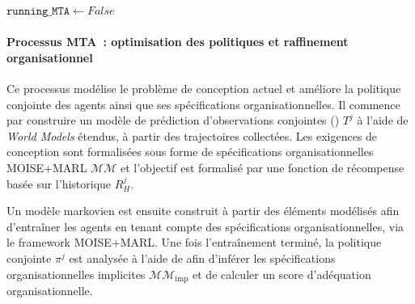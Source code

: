 \begin{algorithm}[h!]
{  

  $\texttt{running\_MTA} \gets False$ 

  }
\end{algorithm}

\paragraph{Processus MTA~: optimisation des politiques et raffinement organisationnel}

Ce processus modélise le problème de conception actuel et améliore la politique conjointe des agents ainsi que ses spécifications organisationnelles. Il commence par construire un modèle de prédiction d'observations conjointes () $T^j$ à l'aide de \textit{World Models} étendus, à partir des trajectoires collectées. Les exigences de conception sont formalisées sous forme de spécifications organisationnelles MOISE+MARL $\mathcal{MM}$ et l'objectif est formalisé par une fonction de récompense basée sur l'historique $R^j_H$.

Un modèle markovien est ensuite construit à partir des éléments modélisés afin d'entraîner les agents en tenant compte des spécifications organisationnelles, via le framework MOISE+MARL. Une fois l'entraînement terminé, la politique conjointe $\pi^j$ est analysée à l'aide de  afin d'inférer les spécifications organisationnelles implicites $\mathcal{MM}_{\text{imp}}$ et de calculer un score d'adéquation organisationnelle.

